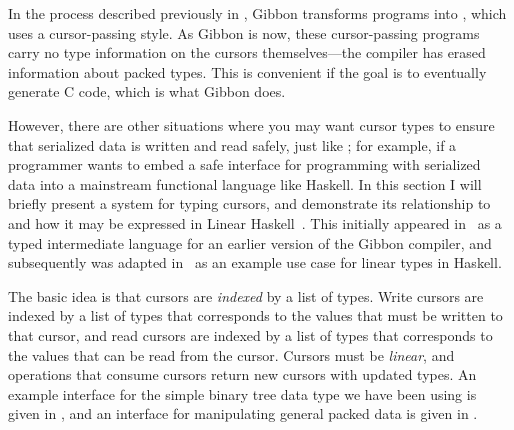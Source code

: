 In the process described previously in , Gibbon
transforms programs into \lamcur{}, which uses a cursor-passing style. As Gibbon
is now, these cursor-passing programs carry no type information on the cursors
themselves---the compiler has erased information about packed types. This is
convenient if the goal is to eventually generate C code, which is what Gibbon
does.

However, there are other situations where you may want cursor types to ensure
that serialized data is written and read safely, just like \ourcalc{}; for
example, if a programmer wants to embed a safe interface for programming with
serialized data into a mainstream functional language like Haskell. In this
section I will briefly present a system for typing cursors, and demonstrate its
relationship to \lamcur{} and how it may be expressed in Linear
Haskell~\cite{linear-haskell}. This initially appeared in~\cite{ecoop17-gibbon}
as a typed intermediate language for an earlier version of the Gibbon compiler,
and subsequently was adapted in~\cite{linear-haskell} as an example use case for
linear types in Haskell.

The basic idea is that cursors are \emph{indexed} by a list of types.
Write cursors are indexed by a list of types that corresponds to the values
that must be written to that cursor, and read cursors are indexed by a list of
types that corresponds to the values that can be read from the cursor.
Cursors must be \emph{linear}, and operations that consume cursors return
new cursors with updated types. An example interface for the simple
binary tree data type we have been using is given in ,
and an interface for manipulating general packed data is given in
.



